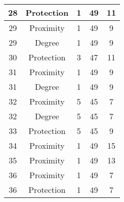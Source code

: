\documentclass[results.tex]{subfiles}
\begin{document}
\begin{center}
\begin{tabular}{| c || c | c | c | c |}
            \hline
            28                      & Protection                   & 1                      & 49                      & 11                   \\
            \hline
            29                      & Proximity                    & 1                      & 49                      & 9                    \\
            \hline
            29                      & Degree                       & 1                      & 49                      & 9                    \\
            \hline
            30                      & Protection                   & 3                      & 47                      & 11                   \\
            \hline
            31                      & Proximity                    & 1                      & 49                      & 9                    \\
            \hline
            31                      & Degree                       & 1                      & 49                      & 9                    \\
            \hline
            32                      & Proximity                    & 5                      & 45                      & 7                    \\
            \hline
            32                      & Degree                       & 5                      & 45                      & 7                    \\
            \hline
            33                      & Protection                   & 5                      & 45                      & 9                    \\
            \hline
            34                      & Proximity                    & 1                      & 49                      & 15                   \\
            \hline
            35                      & Proximity                    & 1                      & 49                      & 13                   \\
            \hline
            36                      & Proximity                    & 1                      & 49                      & 7                    \\
            \hline
            36                      & Protection                   & 1                      & 49                      & 7                    \\

\end{tabular}
\end{center}
\end{document}
